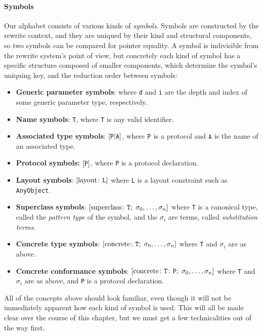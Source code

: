 \documentclass[../generics]{subfiles}
\begin{document}
\paragraph{Symbols}
%
%
%
%
%
%
%
%
%
%
%
%
%
%
%
%
%
%
Our alphabet consists of various kinds of \emph{symbols}. Symbols are constructed by the rewrite context, and they are uniqued by their kind and structural components, so two symbols can be compared for pointer equality. A symbol is indivisible from the rewrite system's point of view, but concretely each kind of symbol has a specific structure composed of smaller components, which determine the symbol's uniquing key, and the reduction order between symbols:
\begin{itemize}
\item \textbf{Generic parameter symbols}:  where \texttt{d} and \texttt{i} are the depth and index of some generic parameter type, respectively.
\item \textbf{Name symbols}: \texttt{T}, where \texttt{T} is any valid identifier.
\item \textbf{Associated type symbols}: $[\texttt{P}|\texttt{A}]$, where $\texttt{P}$ is a protocol and $\texttt{A}$ is the name of an associated type.
\item \textbf{Protocol symbols:} $[\texttt{P}]$, where \texttt{P} is a protocol declaration.
\item \textbf{Layout symbols}: $[\mathrm{layout}\colon\texttt{L}]$ where \texttt{L} is a layout constraint such as \texttt{AnyObject}.
\item \textbf{Superclass symbols}: $[\mathrm{superclass}\colon \texttt{T};\;\sigma_0,\ldots,\sigma_n]$ where \texttt{T} is a canonical type, called the \emph{pattern type} of the symbol, and the $\sigma_i$ are terms, called \emph{substitution terms}.
\item \textbf{Concrete type symbols}: $[\mathrm{concrete}\colon \texttt{T};\;\sigma_0,\ldots,\sigma_n]$ where \texttt{T} and $\sigma_i$ are as above.
\item \textbf{Concrete conformance symbols}: $[\mathrm{concrete}\colon \texttt{T}\colon\texttt{P};\;\sigma_0,\ldots,\sigma_n]$ where \texttt{T} and $\sigma_i$ are as above, and \texttt{P} is a protocol declaration.
\end{itemize}
All of the concepts above should look familiar, even though it will not be immediately apparent how each kind of symbol is used. This will all be made clear over the course of this chapter, but we must get a few technicalities out of the way first.
\end{document}
